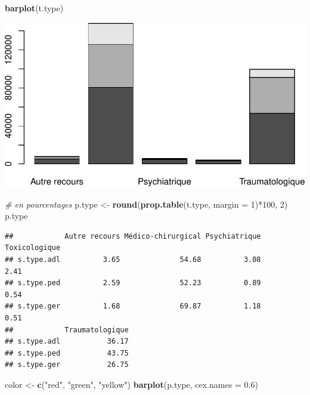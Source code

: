 \documentclass[]{article}
\newenvironment{Shaded}{\begin{snugshade}}{\end{snugshade}}
\newcommand{\KeywordTok}[1]{\textcolor[rgb]{0.13,0.29,0.53}{\textbf{{#1}}}}
\newcommand{\DataTypeTok}[1]{\textcolor[rgb]{0.13,0.29,0.53}{{#1}}}
\newcommand{\DecValTok}[1]{\textcolor[rgb]{0.00,0.00,0.81}{{#1}}}
\newcommand{\FloatTok}[1]{\textcolor[rgb]{0.00,0.00,0.81}{{#1}}}
\newcommand{\StringTok}[1]{\textcolor[rgb]{0.31,0.60,0.02}{{#1}}}
\newcommand{\CommentTok}[1]{\textcolor[rgb]{0.56,0.35,0.01}{\textit{{#1}}}}
\newcommand{\NormalTok}[1]{{#1}}
\begin{document}
\begin{Shaded}
\begin{Highlighting}[]
\KeywordTok{barplot}\NormalTok{(t.type)}
\end{Highlighting}
\end{Shaded}

\includegraphics{analyse_merge_files/figure-latex/synthese-1.pdf}

\begin{Shaded}
\begin{Highlighting}[]
\CommentTok{# en pourcentages}
\NormalTok{p.type <-}\StringTok{ }\KeywordTok{round}\NormalTok{(}\KeywordTok{prop.table}\NormalTok{(t.type, }\DataTypeTok{margin =} \DecValTok{1}\NormalTok{)*}\DecValTok{100}\NormalTok{, }\DecValTok{2}\NormalTok{)}
\NormalTok{p.type}
\end{Highlighting}
\end{Shaded}

\begin{verbatim}
##            Autre recours Médico-chirurgical Psychiatrique Toxicologique
## s.type.adl          3.65              54.68          3.08          2.41
## s.type.ped          2.59              52.23          0.89          0.54
## s.type.ger          1.68              69.87          1.18          0.51
##            Traumatologique
## s.type.adl           36.17
## s.type.ped           43.75
## s.type.ger           26.75
\end{verbatim}

\begin{Shaded}
\begin{Highlighting}[]
\NormalTok{color <-}\StringTok{ }\KeywordTok{c}\NormalTok{(}\StringTok{"red"}\NormalTok{, }\StringTok{"green"}\NormalTok{, }\StringTok{"yellow"}\NormalTok{)}
\KeywordTok{barplot}\NormalTok{(p.type, }\DataTypeTok{cex.names =} \FloatTok{0.6}\NormalTok{)}
\end{Highlighting}
\end{Shaded}
\end{document}

